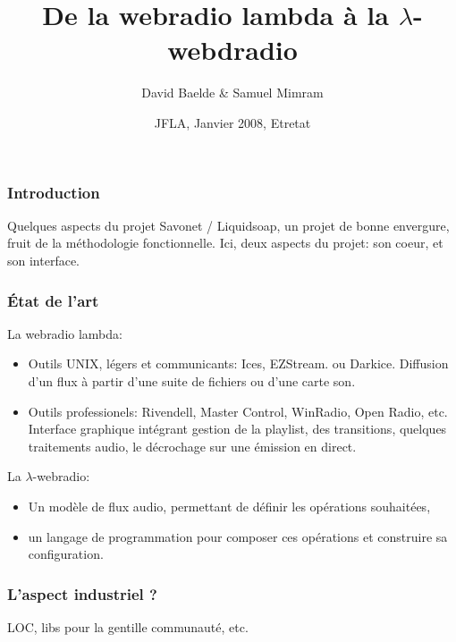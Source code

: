 \documentclass{beamer}
\author{David Baelde \& Samuel Mimram}
\institute{LIX, \'Ecole Polytechnique, INRIA \&
           PPS, Université Paris VII, CNRS}
\title{De la webradio lambda à la $\lambda$-webdradio}
\date{JFLA, Janvier 2008, Etretat}
\renewcommand{\emph}[1]{\alert{#1}}
\begin{document}
\begin{frame}
  \titlepage
\end{frame}

\newenvironment{ssl}[1]{\begin{frame}\frametitle{#1}}{\end{frame}}
 

\begin{ssl}{Introduction}
  Quelques aspects du projet Savonet / Liquidsoap,
  un projet de bonne envergure, fruit de la méthodologie fonctionnelle.
  Ici, deux aspects du projet: son coeur, et son interface.
\end{ssl}

\begin{ssl}{\'Etat de l'art}


La webradio lambda:
\begin{itemize}
\item
  Outils UNIX, \emph{légers} et \emph{communicants}:
  Ices, EZStream. ou Darkice.
  Diffusion d'un flux à partir d'une \emph{suite de fichiers}
  ou d'une \emph{carte son}.
\item
  Outils professionels:
  Rivendell, Master Control, WinRadio, Open Radio, etc.
  Interface \emph{graphique} intégrant gestion 
  de la playlist, des \emph{transitions}, quelques \emph{traitements audio},
  le décrochage sur \emph{une émission en direct}.
\end{itemize}

La $\lambda$-webradio:
\begin{itemize}
\item Un \emph{modèle de flux audio},
  permettant de définir les opérations souhaitées,
\item un langage de programmation pour composer ces opérations
  et construire sa configuration.
\end{itemize}

\end{ssl}

\begin{ssl}{L'aspect industriel ?}
  LOC, libs pour la gentille communauté, etc.
\end{ssl}
\end{document}
